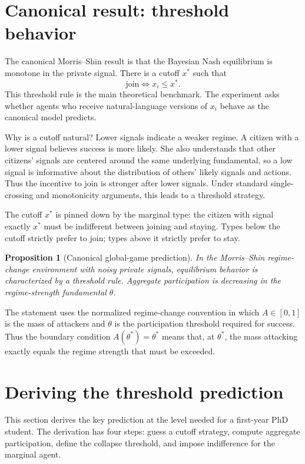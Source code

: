 \documentclass[11pt]{article}
\newtheorem{proposition}{Proposition}
\begin{document}
\section{Canonical result: threshold behavior}

The canonical Morris--Shin result is that the Bayesian Nash equilibrium is monotone in the private signal. There is a cutoff $x^*$ such that
\[
  \text{join} \iff x_i\le x^*.
\]
This threshold rule is the main theoretical benchmark. The experiment asks whether agents who receive natural-language versions of $x_i$ behave as the canonical model predicts.

Why is a cutoff natural? Lower signals indicate a weaker regime. A citizen with a lower signal believes success is more likely. She also understands that other citizens' signals are centered around the same underlying fundamental, so a low signal is informative about the distribution of others' likely signals and actions. Thus the incentive to join is stronger after lower signals. Under standard single-crossing and monotonicity arguments, this leads to a threshold strategy.

The cutoff $x^*$ is pinned down by the marginal type: the citizen with signal exactly $x^*$ must be indifferent between joining and staying. Types below the cutoff strictly prefer to join; types above it strictly prefer to stay.

\begin{proposition}[Canonical global-game prediction]
In the Morris--Shin regime-change environment with noisy private signals, equilibrium behavior is characterized by a threshold rule. Aggregate participation is decreasing in the regime-strength fundamental $\theta$.
\end{proposition}

The statement uses the normalized regime-change convention in which $A\in[0,1]$ is the mass of attackers and $\theta$ is the participation threshold required for success. Thus the boundary condition $A(\theta^*)=\theta^*$ means that, at $\theta^*$, the mass attacking exactly equals the regime strength that must be exceeded.

\section{Deriving the threshold prediction}

This section derives the key prediction at the level needed for a first-year PhD student. The derivation has four steps: guess a cutoff strategy, compute aggregate participation, define the collapse threshold, and impose indifference for the marginal agent.
\end{document}
